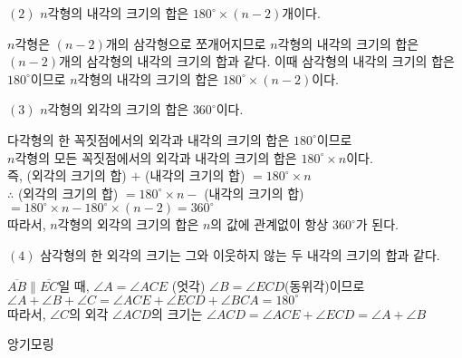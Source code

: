 \documentclass[a4paper]{oblivoir}
\begin{document}
\begin{flushleft}
    $(2)$ $n$각형의 내각의 크기의 합은 $180^{\circ} \times (n-2)$개이다.
\end{flushleft}

\begin{tcolorbox}[colback = skyblue!5!white, colframe = skyblue!99!black, title = \textmd{이해하기}]
    $n$각형은 $(n-2)$개의 삼각형으로 쪼개어지므로 $n$각형의 내각의 크기의 합은
    $(n-2)$개의 삼각형의 내각의 크기의 합과 같다. 이때 삼각형의 내각의 크기의 합은
    $180^{\circ}$이므로 $n$각형의 내각의 크기의 합은 $180^{\circ} \times (n-2)$이다.
\end{tcolorbox}

\begin{flushleft}
    $(3)$ $n$각형의 외각의 크기의 합은 $360^{\circ}$이다.
\end{flushleft}


\begin{tcolorbox}[colback = skyblue!5!white, colframe = skyblue!99!black, title = \textmd{이해하기}]
    다각형의 한 꼭짓점에서의 외각과 내각의 크기의 합은 $180^{\circ}$이므로 \\ $n$각형의 모든 꼭짓점에서의
    외각과 내각의 크기의 합은  $180^{\circ} \times n$이다. \\
    즉, (외각의 크기의 합) $+$ (내각의 크기의 합) $= 180^{\circ} \times n$ \\ 
    $\therefore$ (외각의 크기의 합) $= 180^{\circ} \times n -$ (내각의 크기의 합) \\
    $= 180^{\circ} \times n - 180^{\circ} \times (n-2) = 360^{\circ}$ \\
    따라서, $n$각형의 외각의 크기의 합은 $n$의 값에 관계없이 항상 $360^{\circ}$가 된다.
\end{tcolorbox}

\begin{flushleft}
    $(4)$ 삼각형의 한 외각의 크기는 그와 이웃하지 않는 두 내각의 크기의 합과 같다.
\end{flushleft}

\begin{tcolorbox}[colback = skyblue!5!white, colframe = skyblue!99!black, title = \textmd{이해하기}]
    $\overline{AB} \parallel \overline{EC}$일 때, $\angle A = \angle ACE$ (엇각) $\angle B = \angle ECD$(동위각)이므로\\ 
    $\angle A + \angle B + \angle C = \angle ACE + \angle ECD + \angle BCA = 180^{\circ}$ \\
    따라서, $\angle C$의 외각 $\angle ACD$의 크기는 $\angle ACD = \angle ACE + \angle ECD = \angle A + \angle B$
    
\end{tcolorbox}

\newpage

앙기모링
\end{document}
